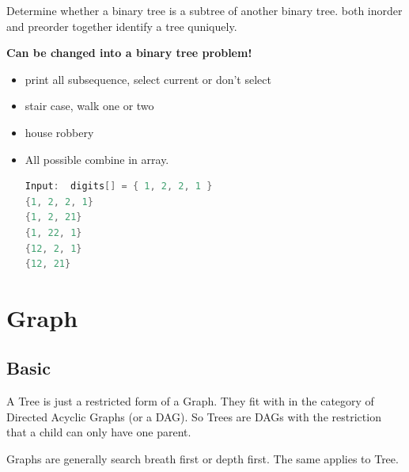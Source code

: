 \documentclass[a4paper,11pt,twoside]{book}
\begin{document}
%

	\par Determine whether a binary tree is a subtree of another binary tree. both inorder and preorder together identify a tree quniquely.

	\par \textbf{Can be changed into a binary tree problem!}
	
\begin{itemize}
	\item print all subsequence, select current or don't select
	\item stair case, walk one or two
	\item house robbery
	\item All possible combine in array. 
	
\begin{lstlisting}[frame=single, language=c++]	
Input:  digits[] = { 1, 2, 2, 1 }	
{1, 2, 2, 1} 
{1, 2, 21} 
{1, 22, 1} 
{12, 2, 1} 
{12, 21} 
\end{lstlisting}
\end{itemize}



\section{Graph}
\subsection{Basic}

	\par A Tree is just a restricted form of a Graph. They fit with in the category of Directed Acyclic Graphs (or a DAG). So Trees are DAGs with the restriction that a child can only have one parent.

	\par Graphs are generally search breath first or depth first. The same applies to Tree.
\end{document}
